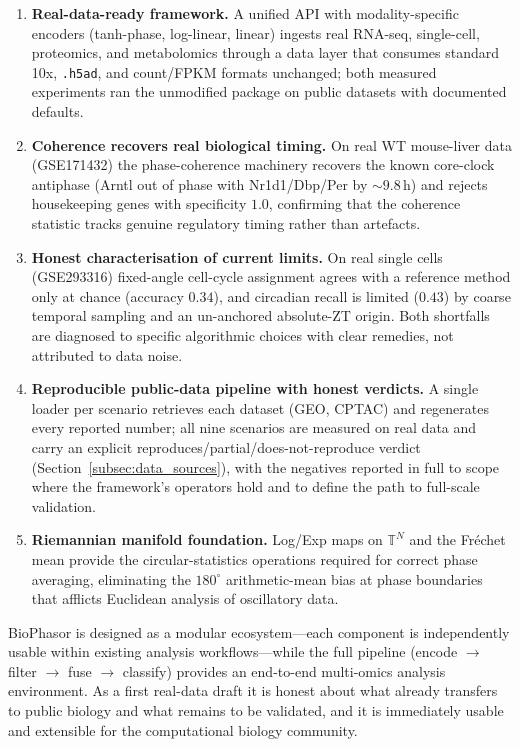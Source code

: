 \documentclass[preprint,12pt,amsmath,amssymb,superscriptaddress,floatfix]{revtex4-2}
\newcommand{\torus}{\mathbb{T}}
\begin{document}
\begin{enumerate}
    \item \textbf{Real-data-ready framework.}
    A unified API with modality-specific encoders (tanh-phase, log-linear,
    linear) ingests real RNA-seq, single-cell, proteomics, and metabolomics
    through a data layer that consumes standard 10x, \texttt{.h5ad}, and
    count/FPKM formats unchanged; both measured experiments ran the
    unmodified package on public datasets with documented defaults.

    \item \textbf{Coherence recovers real biological timing.}
    On real WT mouse-liver data (GSE171432) the phase-coherence machinery
    recovers the known core-clock antiphase (Arntl out of phase with
    Nr1d1/Dbp/Per by $\sim 9.8$\,h) and rejects housekeeping genes with
    specificity $1.0$, confirming that the coherence statistic tracks genuine
    regulatory timing rather than artefacts.

    \item \textbf{Honest characterisation of current limits.}
    On real single cells (GSE293316) fixed-angle cell-cycle assignment agrees
    with a reference method only at chance (accuracy $0.34$), and circadian
    recall is limited ($0.43$) by coarse temporal sampling and an
    un-anchored absolute-ZT origin. Both shortfalls are diagnosed to specific
    algorithmic choices with clear remedies, not attributed to data noise.

    \item \textbf{Reproducible public-data pipeline with honest verdicts.}
    A single loader per scenario retrieves each dataset (GEO, CPTAC) and
    regenerates every reported number; all nine scenarios are measured on real
    data and carry an explicit reproduces/partial/does-not-reproduce verdict
    (Section~\ref{subsec:data_sources}), with the negatives reported in full to
    scope where the framework's operators hold and to define the path to
    full-scale validation.

    \item \textbf{Riemannian manifold foundation.}
    Log/Exp maps on $\torus^N$ and the Fr\'{e}chet mean provide the
    circular-statistics operations required for correct phase averaging,
    eliminating the $180^\circ$ arithmetic-mean bias at phase boundaries that
    afflicts Euclidean analysis of oscillatory data.
\end{enumerate}

BioPhasor is designed as a modular ecosystem---each component is
independently usable within existing analysis workflows---while
the full pipeline (encode $\to$ filter $\to$ fuse $\to$ classify)
provides an end-to-end multi-omics analysis environment.
As a first real-data draft it is honest about what already transfers to
public biology and what remains to be validated, and it is immediately
usable and extensible for the computational biology community.
\end{document}
